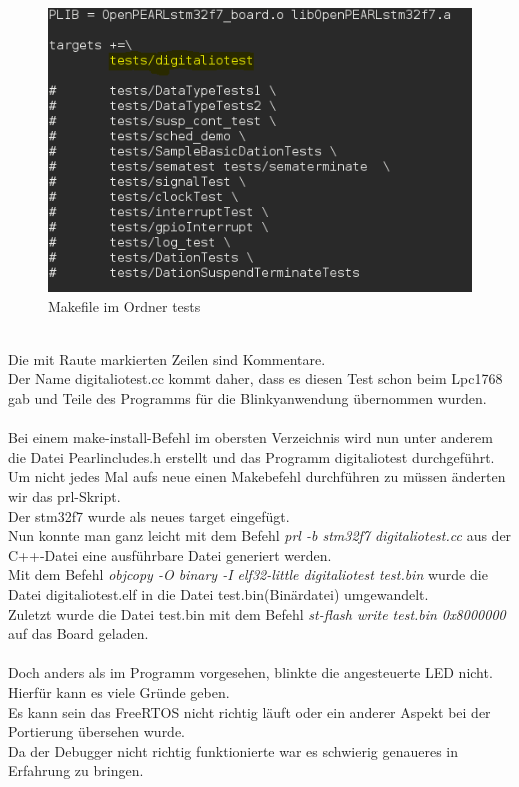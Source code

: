 \begin{figure}[h]
\begin{center}
\includegraphics[width=12cm]{grafiken/Makefile_tests.png}
\caption{Makefile im Ordner tests}
\label{Makefile_tests}
\end{center}
\end{figure}
\\
Die mit Raute markierten Zeilen sind Kommentare.\\
Der Name digitaliotest.cc kommt daher, dass es diesen Test schon beim Lpc1768 gab und Teile des Programms für die Blinkyanwendung übernommen wurden.\\
\\
Bei einem make-install-Befehl im obersten Verzeichnis wird nun unter anderem die Datei Pearlincludes.h erstellt und das Programm digitaliotest durchgeführt.\\
Um nicht jedes Mal aufs neue einen Makebefehl durchführen zu müssen änderten wir das prl-Skript.\\ 
Der stm32f7 wurde als neues target eingefügt.\\
Nun konnte man ganz leicht mit dem Befehl {\textit{prl -b stm32f7 digitaliotest.cc}} aus der C++-Datei eine ausführbare Datei generiert werden.\\
Mit dem Befehl {\textit{objcopy -O binary -I elf32-little digitaliotest test.bin}} wurde die Datei digitaliotest.elf in die Datei test.bin(Binärdatei) umgewandelt.\\
Zuletzt wurde die Datei test.bin mit dem Befehl {\textit{st-flash write test.bin 0x8000000}} auf das Board geladen.\\
\\
Doch anders als im Programm vorgesehen, blinkte die angesteuerte LED nicht.\\
Hierfür kann es viele Gründe geben.\\
Es kann sein das FreeRTOS nicht richtig läuft oder ein anderer Aspekt bei der Portierung übersehen wurde.\\
Da der Debugger nicht richtig funktionierte war es schwierig genaueres in Erfahrung zu bringen.\\

